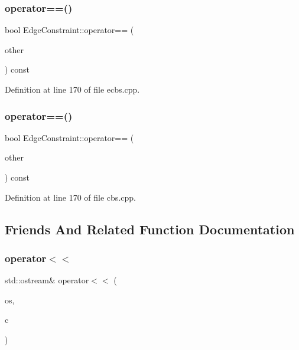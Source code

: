 \subsubsection{\texorpdfstring{operator==()}{operator==()}\hspace{0.1cm}{\footnotesize\ttfamily [1/2]}}
{\footnotesize\ttfamily bool Edge\+Constraint\+::operator== (\begin{DoxyParamCaption}\item[{const \hyperlink{struct_edge_constraint}{Edge\+Constraint} \&}]{other }\end{DoxyParamCaption}) const\hspace{0.3cm}{\ttfamily [inline]}}



Definition at line 170 of file ecbs.\+cpp.

\mbox{\label{struct_edge_constraint_a0bb713ad9bf7afb42e84d85a94656af0}} 
\subsubsection{\texorpdfstring{operator==()}{operator==()}\hspace{0.1cm}{\footnotesize\ttfamily [2/2]}}
{\footnotesize\ttfamily bool Edge\+Constraint\+::operator== (\begin{DoxyParamCaption}\item[{const \hyperlink{struct_edge_constraint}{Edge\+Constraint} \&}]{other }\end{DoxyParamCaption}) const\hspace{0.3cm}{\ttfamily [inline]}}



Definition at line 170 of file cbs.\+cpp.



\subsection{Friends And Related Function Documentation}
\mbox{\label{struct_edge_constraint_a94c3e6e61fef6fe98974b7bcf1b2245e}} 
\subsubsection{\texorpdfstring{operator$<$$<$}{operator<<}\hspace{0.1cm}{\footnotesize\ttfamily [1/2]}}
{\footnotesize\ttfamily std\+::ostream\& operator$<$$<$ (\begin{DoxyParamCaption}\item[{std\+::ostream \&}]{os,  }\item[{const \hyperlink{struct_edge_constraint}{Edge\+Constraint} \&}]{c }\end{DoxyParamCaption})\hspace{0.3cm}{\ttfamily [friend]}}



